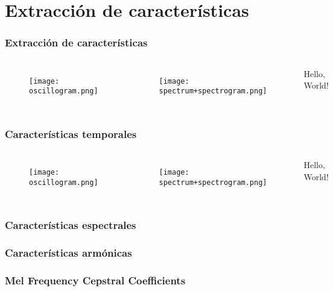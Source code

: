 \section{Extracción de características}\label{sec:features}

\begin{frame}
    \frametitle{Extracción de características}

    \begin{columns}

        \begin{figure}[!h]
            \centering
            \texttt{[image: oscillogram.png]}
        \end{figure}
        \begin{figure}[!h]
            \centering
            \texttt{[image: spectrum+spectrogram.png]}
        \end{figure}


        Hello, World!

    \end{columns}
\end{frame}

\begin{frame}
    \frametitle{Características temporales}

    \begin{columns}

        \begin{figure}[!h]
            \centering
            \texttt{[image: oscillogram.png]}
        \end{figure}
        \begin{figure}[!h]
            \centering
            \texttt{[image: spectrum+spectrogram.png]}
        \end{figure}


        Hello, World!

    \end{columns}
\end{frame}

\begin{frame}
    \frametitle{Características espectrales}

\end{frame}

\begin{frame}
    \frametitle{Características armónicas}

\end{frame}

\begin{frame}
    \frametitle{Mel Frequency Cepstral Coefficients}

\end{frame}